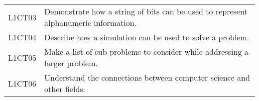 \begin{longtable}{p{1.8cm}p{11cm}}
 L1CT03  & Demonstrate how a string of bits can be used to represent alphanumeric information.                                                                                                                                        \\
 L1CT04  & Describe how a simulation can be used to solve a problem.                                                                                                                                                                  \\
 L1CT05  & Make a list of sub-problems to consider while addressing a larger problem.                                                                                                                                                 \\
 L1CT06  & Understand the connections between computer science and other fields.                                                                                                                                                      \\
\end{longtable}	
